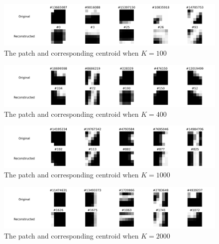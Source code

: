 \documentclass{article}
\begin{document}
\begin{figure}[htbp!]
    \centering
    \includegraphics[width = 0.9 \textwidth]{../Result/Patches/100-clusters-reconstruction.png}
    \caption{The patch and corresponding centroid when $K = 100$}
    \label{fig:patches-100}
\end{figure}


\begin{figure}[htbp!]
    \centering
    \includegraphics[width = 0.9 \textwidth]{../Result/Patches/400-clusters-reconstruction.png}
    \caption{The patch and corresponding centroid when $K = 400$}
    \label{fig:patches-400}
\end{figure}


\begin{figure}[htbp!]
    \centering
    \includegraphics[width = 0.9 \textwidth]{../Result/Patches/1000-clusters-reconstruction.png}
    \caption{The patch and corresponding centroid when $K = 1000$}
    \label{fig:patches-1000}
\end{figure}


\begin{figure}[htbp!]
    \centering
    \includegraphics[width = 0.9 \textwidth]{../Result/Patches/2000-clusters-reconstruction.png}
    \caption{The patch and corresponding centroid when $K = 2000$}
    \label{fig:patches-2000}
\end{figure}
\end{document}
